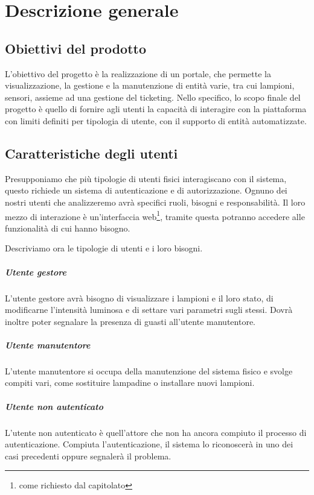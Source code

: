 \chapter{Descrizione generale}

\section{Obiettivi del prodotto}
L'obiettivo del progetto è la realizzazione di un portale, che permette la visualizzazione, la gestione e la manutenzione di entità varie, tra cui lampioni, sensori, assieme ad una gestione del ticketing.
Nello specifico, lo scopo finale del progetto è quello di fornire agli utenti la capacità di interagire con la piattaforma con limiti definiti per tipologia di utente, con il supporto di entità automatizzate.

\section{Caratteristiche degli utenti}

Presupponiamo che più tipologie di utenti fisici interagiscano con il sistema, questo richiede un sistema di autenticazione e di autorizzazione.
Ognuno dei nostri utenti che analizzeremo avrà specifici ruoli, bisogni e responsabilità.
Il loro mezzo di interazione è un'interfaccia web\footnote{come richiesto dal capitolato}, tramite questa potranno accedere alle funzionalità di cui hanno bisogno.

Descriviamo ora le tipologie di utenti e i loro bisogni.

\paragraph{Utente gestore} L'utente gestore avrà bisogno di visualizzare i lampioni e il loro stato, di modificarne l'intensità luminosa e di settare vari parametri sugli stessi. Dovrà inoltre poter segnalare la presenza di guasti all'utente manutentore.

\paragraph{Utente manutentore} L'utente manutentore si occupa della manutenzione del sistema fisico e svolge compiti vari, come sostituire lampadine o installare nuovi lampioni.

\paragraph{Utente non autenticato} L'utente non autenticato è quell'attore che non ha ancora compiuto il processo di autenticazione. Compiuta l'autenticazione, il sistema lo riconoscerà in uno dei casi precedenti oppure segnalerà il problema.

